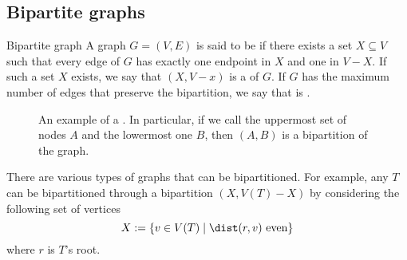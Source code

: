 \documentclass[a4paper, 12pt]{report}
\begin{document}
    \subsection{Bipartite graphs}

    \begin{frameddefn}{Bipartite graph}
        A graph $G = (V, E)$ is said to be  if there exists a set $X \subseteq V$ such that every edge of $G$ has exactly one endpoint in $X$ and one in $V - X$. If such a set $X$ exists, we say that $(X, V - x)$ is a  of $G$. If $G$ has the maximum number of edges that preserve the bipartition, we say that is .
    \end{frameddefn}

    \begin{figure}[H]
        \centering
        \caption{An example of a . In particular, if we call the uppermost set of nodes $A$ and the lowermost one $B$, then $(A, B)$ is a bipartition of the graph.}
    \end{figure}

    There are various types of graphs that can be bipartitioned. For example, any  $T$ can be bipartitioned through a bipartition $(X, V(T) - X)$ by considering the following set of vertices $$X := \{v \in V(T) \mid \dist(r, v) \ \mathrm{even}\}$$ where $r$ is $T$'s root.
\end{document}
